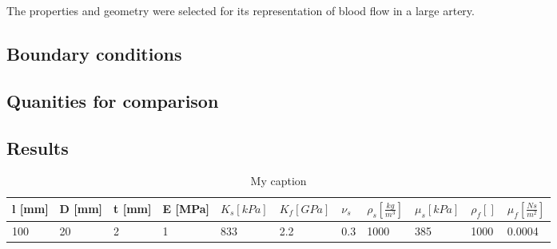 The properties and geometry were selected for its representation of blood flow in a large artery. 

\subsection*{Boundary conditions}


\subsection*{Quanities for comparison}

\subsection*{Results}
\begin{table}[h!]
\centering
\caption{My caption}
\label{my-label}
\begin{tabular}{|l|l|l|l|l|l|l|l|l|l|l|}
\hline
l {[}mm{]} & D {[}mm{]} & t {[}mm{]} & E {[}MPa{]} & $K_s [kPa] $ & $K_f [GPa]$ & $\nu_s $ & $\rho_s [\frac{kg}{m^3}]$ & $ \mu_s [kPa]  $ & $\rho_f []$ & $\mu_f [\frac{Ns}{m^2}]$ \\ \hline
100 & 20 & 2 & 1 & 833 & 2.2 & 0.3 & 1000 & 385 & 1000 & 0.0004 \\ \hline
\end{tabular}
\end{table}